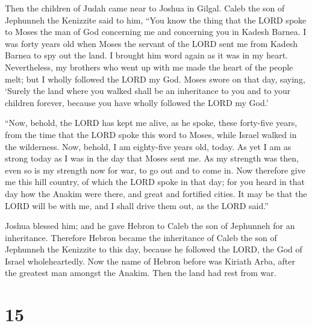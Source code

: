  Then the children of Judah came near to Joshua in Gilgal.
Caleb the son of Jephunneh the Kenizzite said to him, ``You know the
thing that the LORD spoke to Moses the man of God concerning me and
concerning you in Kadesh Barnea.  I was forty years old
when Moses the servant of the LORD sent me from Kadesh Barnea to spy out
the land. I brought him word again as it was in my heart. 
Nevertheless, my brothers who went up with me made the heart of the
people melt; but I wholly followed the LORD my God.  Moses
swore on that day, saying, `Surely the land where you walked shall be an
inheritance to you and to your children forever, because you have wholly
followed the LORD my God.'

 ``Now, behold, the LORD has kept me alive, as he spoke,
these forty-five years, from the time that the LORD spoke this word to
Moses, while Israel walked in the wilderness. Now, behold, I am
eighty-five years old, today.  As yet I am as strong
today as I was in the day that Moses sent me. As my strength was then,
even so is my strength now for war, to go out and to come in.
 Now therefore give me this hill country, of which the
LORD spoke in that day; for you heard in that day how the Anakim were
there, and great and fortified cities. It may be that the LORD will be
with me, and I shall drive them out, as the LORD said.''

 Joshua blessed him; and he gave Hebron to Caleb the son
of Jephunneh for an inheritance.  Therefore Hebron became
the inheritance of Caleb the son of Jephunneh the Kenizzite to this day,
because he followed the LORD, the God of Israel wholeheartedly.
 Now the name of Hebron before was Kiriath Arba, after
the greatest man amongst the Anakim. Then the land had rest from war.

\hypertarget{section-14}{%
\section{15}\label{section-14}}

